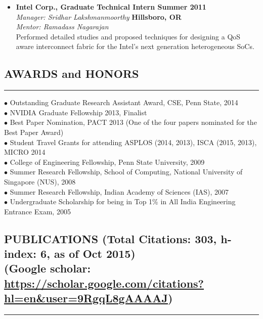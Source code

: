 \documentclass[10pt,a4]{article}
\begin{document}
\begin{itemize}
\item{\bf Intel Corp., Graduate Technical Intern \hfill {\bf Summer 2011}} \\
{\it Manager: Sridhar Lakshmanmoorthy}  \hfill {\bf Hillsboro, OR} \\ 
{\it Mentor: Ramadass Nagarajan}   \\
Performed detailed studies and proposed techniques for designing a QoS aware 
interconnect fabric for the Intel's next generation heterogeneous SoCs. 

\end{itemize}

\subsection*{AWARDS and HONORS}
\hrule
\vspace{0.2cm}

$\bullet$  Outstanding Graduate Research Assistant Award, CSE, Penn State, 2014 \\
$\bullet$  NVIDIA Graduate Fellowship 2013, Finalist \\
$\bullet$  Best Paper Nomination, PACT 2013 (One of the four papers nominated for the Best Paper Award) \\
$\bullet$  Student Travel Grants for attending ASPLOS (2014, 2013), ISCA (2015, 2013), MICRO 2014 \\
$\bullet$  College of Engineering Fellowship, Penn State University, 2009 \\
$\bullet$  Summer Research Fellowship, School of Computing, National University of Singapore (NUS), 2008 \\
$\bullet$  Summer Research Fellowship, Indian Academy of Sciences (IAS), 2007 \\
$\bullet$  Undergraduate Scholarship for being in Top 1\% in All India Engineering Entrance Exam, 2005

\subsection*{PUBLICATIONS (Total Citations: 303, h-index: 6, as of Oct 2015) \\ (Google scholar: \url{https://scholar.google.com/citations?hl=en&user=9RgqL8gAAAAJ}) }
\hrule
\vspace{0.2cm}
\end{document}
